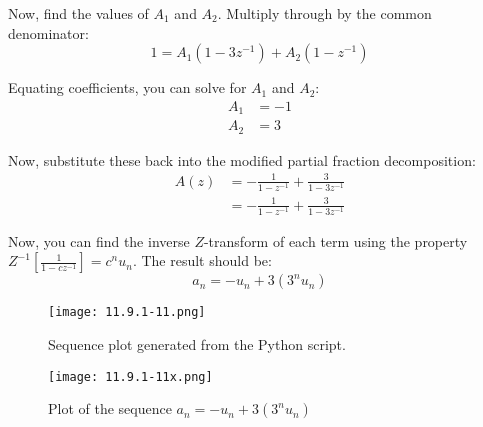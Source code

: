 \documentclass[12pt]{article}
\begin{document}
Now, find the values of \(A_1\) and \(A_2\). Multiply through by the common denominator:
\begin{equation}
1 = A_1(1-3z^{-1}) + A_2(1-z^{-1})
\end{equation}

Equating coefficients, you can solve for \(A_1\) and \(A_2\):
\begin{align}
A_1 &= -1 \\
A_2 &= 3
\end{align}

Now, substitute these back into the modified partial fraction decomposition:
\begin{align*}
A(z) &= -\frac{1}{1-z^{-1}} + \frac{3}{1-3z^{-1}} \\
&= -\frac{1}{1 - z^{-1}} + \frac{3}{1 - 3z^{-1}}
\end{align*}

Now, you can find the inverse \(Z\)-transform of each term using the property \(Z^{-1}\left[\frac{1}{1-cz^{-1}}\right] = c^n u_n\). The result should be:
\begin{equation}
a_n = -u_n + 3(3^n u_n)
\end{equation}

\begin{figure}[h]
    \centering
    \texttt{[image: 11.9.1-11.png]}
    \caption{Sequence plot generated from the Python script.}
    \label{fig:sequence-plot}
\end{figure}

\begin{figure}[h]
  \centering
  \texttt{[image: 11.9.1-11x.png]} %
  \caption{Plot of the sequence \(a_n = -u_n + 3(3^n u_n)\)}
  \label{fig:sequence_plot}
\end{figure}
\end{document}
